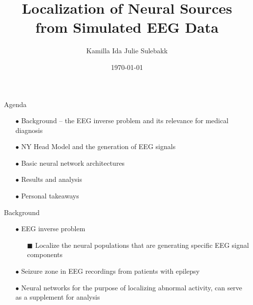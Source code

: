 \documentclass[aspectratio=169]{beamer}
\title{Localization of Neural Sources from Simulated EEG Data}
\author{Kamilla Ida Julie Sulebakk}
\date{\today}
\begin{document}
\maketitle

\begin{frame}{Agenda}
    \begin{itemize}
        \item[$\bullet$] Background -- the EEG inverse problem and its relevance for medical diagnosis
        \item[$\bullet$] NY Head Model and the generation of EEG signals
        \item[$\bullet$] Basic neural network architectures
        \item[$\bullet$] Results and analysis
        \item[$\bullet$] Personal takeaways
    \end{itemize}
\end{frame}





\begin{frame}{Background}
    \begin{itemize}
        \item[$\bullet$] EEG inverse problem
        \begin{itemize}
            \item[\tiny$\blacksquare$] Localize the neural populations that are generating specific EEG signal components
        \end{itemize}
        \item[$\bullet$] Seizure zone in EEG recordings from patients with epilepsy
        \item[$\bullet$] Neural networks for the purpose of localizing abnormal activity, can serve as a supplement for analysis

    \end{itemize}
\end{frame}
\end{document}
